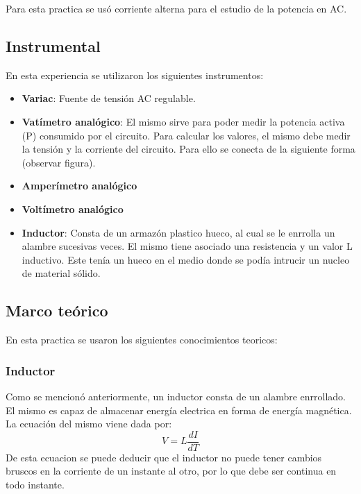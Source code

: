 \documentclass{article}
\begin{document}
        Para esta practica se usó corriente alterna para el estudio de la potencia en AC. 
    

        \subsection{Instrumental}

        En esta experiencia se utilizaron los siguientes instrumentos:

        \begin{itemize}
            \renewcommand{\labelitemi}{$\bullet$}
            \item {\bfseries Variac}: Fuente de tensión AC regulable. 
            \item {\bfseries Vatímetro analógico}: El mismo sirve para poder medir la potencia activa (P) consumido por el circuito.
                    Para calcular los valores, el mismo debe medir la tensión y la corriente del circuito. Para ello se conecta de la siguiente forma (observar figura). \par
                
            \item {\bfseries Amperímetro analógico}
            \item {\bfseries Voltímetro analógico}
            \item {\bfseries Inductor}: Consta de un armazón plastico hueco, al cual se le enrrolla un alambre sucesivas veces. El mismo tiene asociado una resistencia y un valor L inductivo. 
                Este tenía un hueco en el medio donde se podía intrucir un nucleo de material sólido. 
        \end{itemize}
        
        \subsection{Marco teórico}

        En esta practica se usaron los siguientes conocimientos teoricos:

        \subsubsection{Inductor}

        Como se mencionó anteriormente, un inductor consta de un alambre enrrollado. El mismo es capaz de almacenar energía electrica en forma de energía magnética.
         La ecuación del mismo viene dada por:
        \begin{equation*}
            V=L \frac{dI}{dT}
        \end{equation*}
        De esta ecuacion se puede deducir que el inductor no puede tener cambios bruscos en la corriente de un instante al otro, por lo que debe ser continua en todo instante.
\end{document}
